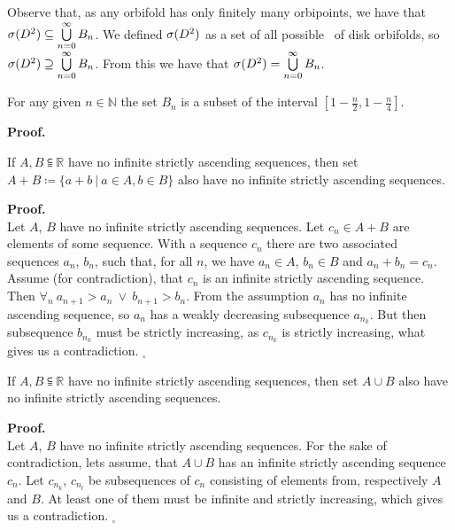 \begin{observation}\label{form_of_a_spectrum}
Observe that, as any orbifold has only finitely many orbipoints, we have that ${{\sigma}(D^2)} \subseteq 
\bigcup\limits^\infty_{n=0}B_n $. We defined ${{\sigma}(D^2)}$ as a set of all possible \Eoc\ of disk 
orbifolds, so ${{\sigma}(D^2)} \supseteq 
\bigcup\limits^\infty_{n=0}B_n $. From this we have that ${{\sigma}(D^2)} = \bigcup\limits^\infty_{n=0}B_n$.
\end{observation}

\begin{lemma}\label{fixed_number_of_orbipoints}
For any given $n \in \mathbb{N}$ the set $B_n$ is a subset of the interval 
$[1-\frac{n}{2}, 1-\frac{n}{4}]$.
\end{lemma}
\textbf{Proof.} \\


\begin{lemma}\label{two_sets_lemma}
If $A, B \subseteqq \mathbb{R}$ have no infinite strictly ascending sequences, then set 
$A + B \coloneqq \{a+b\ |\ a \in A, b \in B\}$ also have no infinite strictly ascending sequences. 
\end{lemma}
\noindent\textbf{Proof.} \\
Let $A$, $B$ have no infinite strictly ascending sequences. 
Let $c_n \in A + B$ are elements of some sequence. With a sequence $c_n$ there are 
two associated sequences $a_n$, $b_n$, such that, for all $n$, we have $a_n \in A$, 
$b_n \in B$ and 
$a_n + b_n = c_n$. Assume (for contradiction), that $c_n$ is an infinite strictly 
ascending sequence. 
Then $\forall_n\ a_{n+1}>a_n\ \lor\ b_{n+1} > b_n$. From the assumption $a_n$ has no infinite 
ascending sequence, so $a_n$ has a weakly decreasing subsequence $a_{n_k}$. But then 
subsequence $b_{n_k}$ must be strictly increasing, as $c_{n_k}$ is strictly increasing, what gives 
us a contradiction. 
$_\square$ 

\begin{lemma}\label{sum_lemma}
If $A, B \subseteqq \mathbb{R}$ have no infinite strictly ascending sequences, then set 
$A \cup B$ also have no infinite strictly ascending sequences.
\end{lemma}
\textbf{Proof.} \\
Let $A$, $B$ have no infinite strictly ascending sequences. 
For the sake of contradiction, lets assume, that $A \cup B$ has an infinite strictly 
ascending sequence $c_n$. Let $c_{n_k}$, $c_{n_l}$ be subsequences of $c_n$ consisting 
of elements from, respectively $A$ and $B$. At least one of them must be infinite and 
strictly increasing, which gives us a contradiction. $_\square$ 

